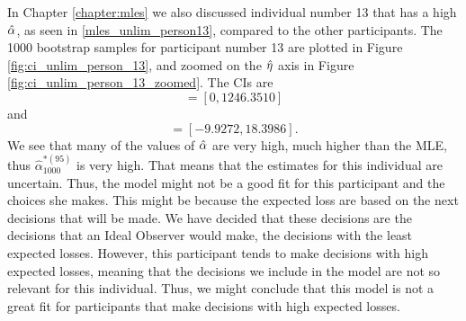 In Chapter \ref{chapter:mles} we also discussed individual number 13 that has a high $\hat{\alpha}$, as seen in \eqref{mles_unlim_person13}, compared to the other participants. The 1000 bootstrap samples for participant number 13 are plotted in Figure \ref{fig:ci_unlim_person_13}, and zoomed on the $\hat{\eta}$ axis in Figure \ref{fig:ci_unlim_person_13_zoomed}. The CIs are
\begin{equation*}
    [\hat{\alpha}^{*(5)}_{1000},\hat{\alpha}^{*(95)}_{1000}] = [0,1246.3510]
\end{equation*}
and
\begin{equation*}
    [\hat{\eta}^{*(5)}_{1000},\hat{\eta}^{*(95)}_{1000}] = [-9.9272,18.3986].
\end{equation*}
We see that many of the values of $\hat{\alpha}$ are very high, much higher than the MLE, thus $\hat{\alpha}^{*(95)}_{1000}$ is very high. That means that the estimates for this individual are uncertain. Thus, the model might not be a good fit for this participant and the choices she makes. This might be because the expected loss are based on the next decisions that will be made. We have decided that these decisions are the decisions that an Ideal Observer would make, the decisions with the least expected losses. However, this participant tends to make decisions with high expected losses, meaning that the decisions we include in the model are not so relevant for this individual. Thus, we might conclude that this model is not a great fit for participants that make decisions with high expected losses. 
